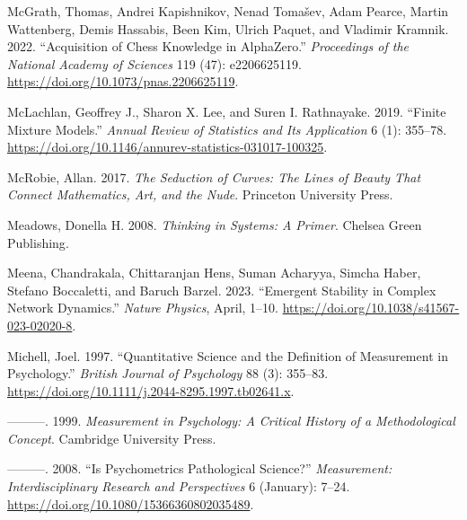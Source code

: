 \documentclass[
  a4paper,
  DIV=11,
  numbers=noendperiod]{scrreprt}
\newlength{\cslhangindent}
\newlength{\cslentryspacingunit} %
\newenvironment{CSLReferences}[2] %
 {%
  \setlength{\parindent}{0pt}
  \ifodd #1
  \let\oldpar\par
  \def\par{\hangindent=\cslhangindent\oldpar}
  \fi
  \setlength{\parskip}{#2\cslentryspacingunit}
 }%
 {}
\begin{document}
\begin{CSLReferences}{1}{0}
\leavevmode{}%
McGrath, Thomas, Andrei Kapishnikov, Nenad Tomašev, Adam Pearce, Martin
Wattenberg, Demis Hassabis, Been Kim, Ulrich Paquet, and Vladimir
Kramnik. 2022. {``Acquisition of Chess Knowledge in {AlphaZero}.''}
\emph{Proceedings of the National Academy of Sciences} 119 (47):
e2206625119. \url{https://doi.org/10.1073/pnas.2206625119}.

\leavevmode{}%
McLachlan, Geoffrey J., Sharon X. Lee, and Suren I. Rathnayake. 2019.
{``Finite {Mixture Models}.''} \emph{Annual Review of Statistics and Its
Application} 6 (1): 355--78.
\url{https://doi.org/10.1146/annurev-statistics-031017-100325}.

\leavevmode{}%
McRobie, Allan. 2017. \emph{The {Seduction} of {Curves}: {The Lines} of
{Beauty That Connect Mathematics}, {Art}, and the {Nude}}. {Princeton
University Press}.

\leavevmode{}%
Meadows, Donella H. 2008. \emph{Thinking in {Systems}: {A Primer}}.
{Chelsea Green Publishing}.

\leavevmode{}%
Meena, Chandrakala, Chittaranjan Hens, Suman Acharyya, Simcha Haber,
Stefano Boccaletti, and Baruch Barzel. 2023. {``Emergent Stability in
Complex Network Dynamics.''} \emph{Nature Physics}, April, 1--10.
\url{https://doi.org/10.1038/s41567-023-02020-8}.

\leavevmode{}%
Michell, Joel. 1997. {``Quantitative Science and the Definition of
Measurement in Psychology.''} \emph{British Journal of Psychology} 88
(3): 355--83. \url{https://doi.org/10.1111/j.2044-8295.1997.tb02641.x}.

\leavevmode{}%
---------. 1999. \emph{Measurement in {Psychology}: {A Critical History}
of a {Methodological Concept}}. {Cambridge University Press}.

\leavevmode{}%
---------. 2008. {``Is {Psychometrics Pathological Science}?''}
\emph{Measurement: Interdisciplinary Research and Perspectives} 6
(January): 7--24. \url{https://doi.org/10.1080/15366360802035489}.


\end{CSLReferences}
\end{document}
